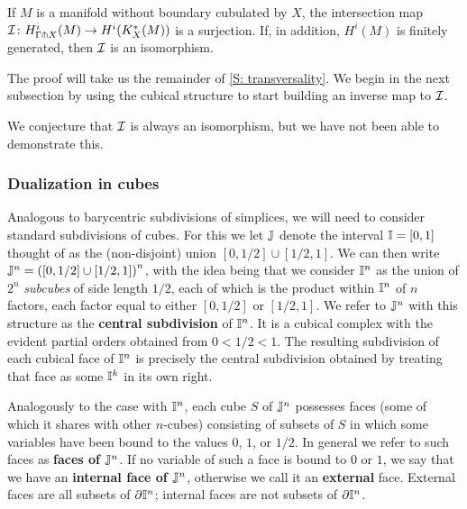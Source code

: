 \begin{theorem}\label{T: intersection qi}
	If $M$ is a manifold without boundary cubulated by $X$, the intersection map $\mathcal{I} \colon H^i_{\Gamma \pitchfork X}(M) \to H^i(K_X^*(M))$ is a surjection.
	If, in addition, $H^i(M)$ is finitely generated, then $\mathcal{I}$ is an isomorphism.
\end{theorem}

The proof will take us the remainder of \cref{S: transversality}.
We begin in the next subsection by using the cubical structure to start building an inverse map to $\mathcal{I}$.

We conjecture that $\mathcal{I}$ is always an isomorphism, but we have not been able to demonstrate this.

\subsubsection{Dualization in cubes}\label{S: dual cubes}

Analogous to barycentric subdivisions of simplices, we will need to consider standard subdivisions of cubes.
For this we let $\mathbb{J}$ denote the interval $\mathbb{I} = [0,1]$ thought of as the (non-disjoint) union $[0,1/2] \cup [1/2,1]$.
We can then write $\mathbb{J}^n = \left([0,1/2] \cup [1/2,1]\right)^n$, with the idea being that we consider $\mathbb{I}^n$ as the union of $2^n$ \textit{subcubes} of side length $1/2$, each of which is the product within $\mathbb{I}^n$ of $n$ factors, each factor equal to either $[0,1/2]$ or $[1/2,1]$.
We refer to $\mathbb{J}^n$ with this structure as the \textbf{central subdivision} of $\mathbb{I}^n$.
It is a cubical complex with the evident partial orders obtained from $0 < 1/2 < 1$.
The resulting subdivision of each cubical face of $\mathbb{I}^n$ is precisely the central subdivision obtained by treating that face as some $\mathbb{I}^k$ in its own right.

Analogously to the case with $\mathbb{I}^n$, each cube $S$ of $\mathbb{J}^n$ possesses faces (some of which it shares with other $n$-cubes) consisting of subsets of $S$ in which some variables have been bound to the values $0$, $1$, or $1/2$.
In general we refer to such faces as \textbf{faces of $\mathbb{J}^n$}.
If no variable of such a face is bound to $0$ or $1$, we say that we have an \textbf{internal face of $\mathbb{J}^n$}, otherwise we call it an \textbf{external} face.
External faces are all subsets of $\partial \mathbb{I}^n$; internal faces are not subsets of $\partial \mathbb{I}^n$.


